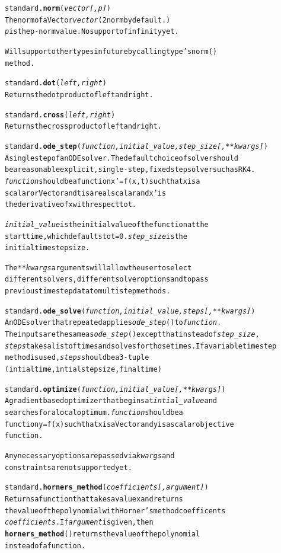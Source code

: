 \documentclass{book}
\begin{document}
\begin{alltt}
standard.\textbf{norm}(\emph{ vector[,p]})
    The norm of a Vector \emph{vector} (2 norm by default.)
    \emph{p} is the p-norm value. No support of infinity yet.

    Will support other types in future by calling type's norm()
    method.

standard.\textbf{dot}(\emph{ left,right})
    Returns the dot product of left and right.

standard.\textbf{cross}(\emph{ left,right})
    Returns the cross product of left and right.

standard.\textbf{ode_step}(\emph{function, initial_value, step_size[, **kwargs]})
    A single step of an ODE solver. The default choice of solver should 
    be a reasonable explicit, single-step, fixed step solver such as RK4. 
    \emph{function} should be a  function x'=f( x,t ) such that x is a 
    scalar or Vector and t is a real scalar and x' is
    the derivative of x with respect to t.

    \emph{initial_value} is the initial value of the function at the
     start time, which defaults to t=0. \emph{step_size} is the 
     initial time step size. 

    The \emph{**kwargs} arguments will allow the user to select
    different solvers, different solver options and to pass 
    previous time step data to multistep methods.

standard.\textbf{ode_solve}(\emph{function, initial_value, steps[, **kwargs]})
    An ODE solver that repeated applies \emph{ode_step}() to \emph{function}.
    The inputs are the same as \emph{ode_step}() except that instead of \emph{step_size},
    \emph{steps} takes a list of times and solves for those times. If a variable time step 
    method is used, \emph{steps} should be a 3-tuple 
    (intial time, intial step size, final time)

standard.\textbf{optimize}(\emph{function, initial_value[, **kwargs]})
    A gradient based optimizer that begins at \emph{intial_value} and 
    searches for a local optimum. \emph{function} should be a
    function y=f( x ) such that x is a Vector and y is a scalar objective 
    function.

    Any necessary options are passed via \emph{kwargs} and
    constraints are not supported yet.

standard.\textbf{horners_method}(\emph{coefficients[, argument]})
    Returns a function that takes a value x and returns 
    the value of the polynomial with Horner's method coefficents
    \emph{coefficients}. If \emph{argument} is given, then 
    \textbf{horners_method}() returns the value of the polynomial
    instead of a function.


\end{alltt}
\end{document}
